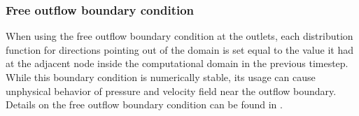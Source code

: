 \subsubsection{Free outflow boundary condition}\label{symmetric bc}
When using the free outflow boundary condition at the outlets, each distribution function for directions pointing out of the domain is set equal to the value it had at the adjacent node inside the computational domain in the previous timestep. While this boundary condition is numerically stable, its usage can cause unphysical behavior of pressure and velocity field near the outflow boundary. Details on the free outflow boundary condition can be found in \cite{PE}.